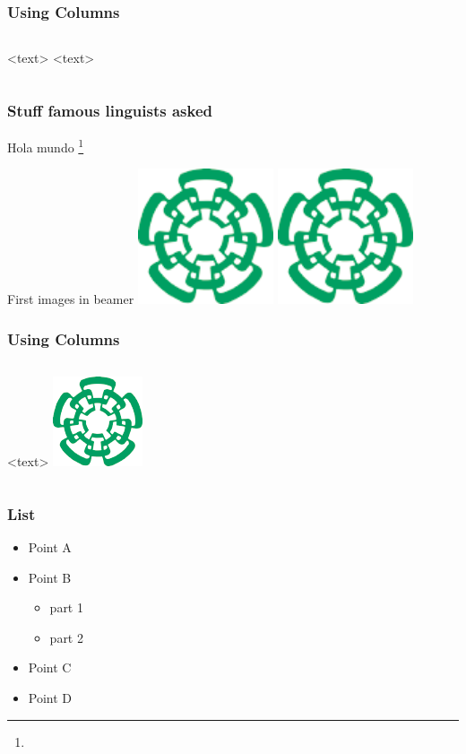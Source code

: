 \documentclass[
	11pt, %
]{beamer}
\newcommand\footcite[1]{\footnote{\bibentry{#1}}\label{\thepage:#1}}
\begin{document}
\begin{frame}
  \frametitle{Using Columns}
  \begin{columns}
    <text>
    <text>
  \end{columns}
\end{frame}

\begin{frame}
  \frametitle{Stuff famous linguists asked}
  Hola mundo \cite{james} \footcite{james}
  
\end{frame}

\begin{frame}{First images in beamer}
\centering
    \includegraphics[width=4cm,angle=45]{cinvestavlogo}
    \includegraphics[angle=45,width=4cm]{cinvestavlogo}
\end{frame}

\begin{frame}
\frametitle{Using Columns}
\begin{columns}
<text>
\centering
\includegraphics[scale=0.5]{cinvestavlogo}
\end{columns}
\end{frame}

\begin{frame}
\frametitle{List}
\begin{itemize}
\item Point A
\item Point B
\begin{itemize}
\item part 1
\item part 2
\end{itemize}
\item Point C
\item Point D
\end{itemize}
\end{frame}
\end{document}

